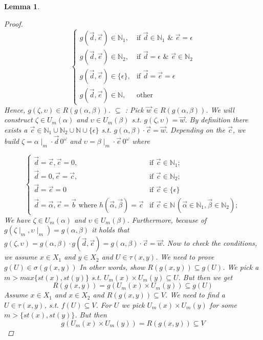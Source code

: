 \documentclass[12pt, a4paper]{scrartcl}
\newtheorem{lemma}[definition]{Lemma}
\begin{document}
\begin{lemma}
\begin{proof}
        \[
            \begin{cases}
            g(\vec{d}, \vec{e}) \in \mathbb{N}_1, & \text{if } \vec{d} \in \mathbb{N}_1 \text{ \&\ } \vec{e} = \epsilon \\
            g(\vec{d}, \vec{e}) \in \mathbb{N}_2, & \text{if } \vec{d} = \epsilon \text{ \&\ } \vec{e} \in \mathbb{N}_2\\
            g(\vec{d}, \vec{e}) \in \{\epsilon\}, & \text{if } \vec{d} =\vec{e} = \epsilon \\
            g(\vec{d}, \vec{e}) \in \mathbb{N}, & \text{other }
            \end{cases}
        \]
            Hence, $g(\zeta, \upsilon) \in R(g(\alpha,\beta))$. \newline \newline
            $\subseteq$ :  Pick $\vec{w} \in R(g(\alpha,\beta))$. We will construct $\zeta \in U_m(\alpha)$ and $\upsilon \in U_m(\beta)$ s.t. $g(\zeta,\upsilon) = \vec{w}$.
            By definition there exists a $\vec{c} \in \mathbb{N}_1 \cup \mathbb{N}_2 \cup \mathbb{N} \cup \{\epsilon\}$ s.t. $g(\alpha,\beta) \cdot \vec{c} = \vec{w}$. Depending on the $\vec{c}$,
            we build $\zeta = \alpha \mid_m \cdot \vec{d} \, 0^\omega$ and $\upsilon = \beta \mid_m \cdot \vec{e} \, 0^\omega$ where 

        \[
            \begin{cases}
            \vec{d} = \vec{c}, \vec{e} = 0, & \text{if }  \vec{c }\in \mathbb{N}_{1}; \\
            \vec{d} = 0, \vec{e} = \vec{c}, & \text{if }  \vec{c }\in \mathbb{N}_{2}; \\
            \vec{d} = \vec{e} = 0& \text{if } \vec{c }\in \{\epsilon\} \\
            \vec{d} = \vec{\alpha}, \vec{e} = \vec{b} \text{    where }h(\vec{\alpha},\vec{\beta}) = \vec{c} & \text{if } \vec{c } \in \mathbb{N} \, (\vec{\alpha} \in \mathbb{N}_1, \vec{\beta} \in \mathbb{N}_2);
            \end{cases}
        \] 
        \newline
        We have $\zeta \in U_m(\alpha)$ and $\upsilon \in U_m(\beta)$. Furthermore, because of $g(\zeta \mid_m, \upsilon \mid_m) = g(\alpha,\beta)$ it holds that $g(\zeta, \upsilon) = g(\alpha,\beta) \cdot g(\vec{d}, \vec{e}) = g(\alpha,\beta) \cdot \vec{c} = \vec{w}$. \newline \newline 
        Now to check the conditions, we assume $x \in X_1$ and $y \in X_2$ and $U \in \tau(x,y)$. We need to prove $g(U) \in \sigma(g(x,y))$ In other words, show $R(g(x,y)) \subseteq g(U)$. We pick a $m> max\{st(x),st(y)\}$ s.t. $U_m(x) \times U_m(y) \subseteq U$. But then we get 
        $$R(g(x,y)) = g(U_m(x) \times U_m(y)) \subseteq g(U)$$
        \newline
        Assume  $x \in X_1$ and $x \in X_2$ and $R(g(x,y)) \subseteq V$. We need to find a $U \in \tau(x,y)$, s.t. $f(U) \subseteq V$.
        For $U$ we pick $U_m(x) \times U_m(y)$ for some $m > \{st(x), st(y)\}$. But then 
        $$g(U_m(x) \times U_m(y)) = R(g(x,y)) \subseteq V$$


\end{proof}
\end{lemma}
\end{document}
